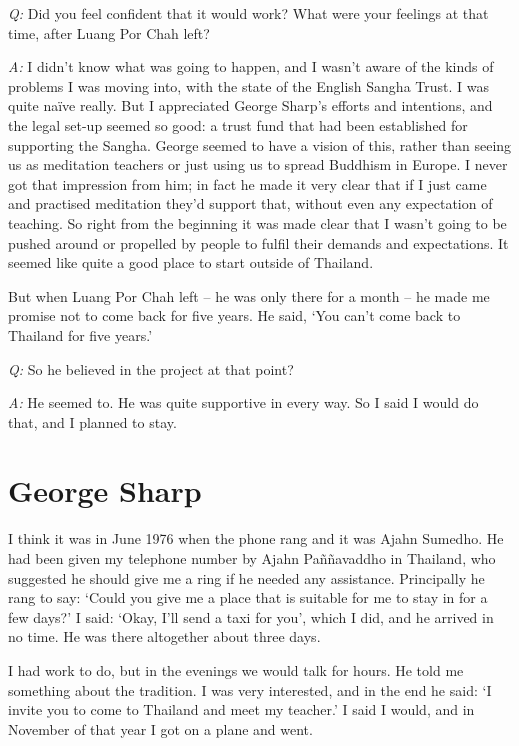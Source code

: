 \emph{Q:} Did you feel confident that it would work? What were your
feelings at that time, after Luang Por Chah left? 

\emph{A:} I didn't know what was going to happen, and I wasn't aware of the
kinds of problems I was moving into, with the state of the English
Sangha Trust. I was quite naïve really. But I appreciated George Sharp's
efforts and intentions, and the legal set-up seemed so good: a trust
fund that had been established for supporting the Sangha. George seemed
to have a vision of this, rather than seeing us as meditation teachers
or just using us to spread Buddhism in Europe. I never got that
impression from him; in fact he made it very clear that if I just came
and practised meditation they'd support that, without even any
expectation of teaching. So right from the beginning it was made clear
that I wasn't going to be pushed around or propelled by people to fulfil
their demands and expectations. It seemed like quite a good place to
start outside of Thailand.

But when Luang Por Chah left -- he was only there for a month -- he made
me promise not to come back for five years. He said, `You can't come
back to Thailand for five years.'

\emph{Q:} So he believed in the project at that point?

\emph{A:} He seemed to. He was quite supportive in every way. So I said
I would do that, and I planned to stay.

\section{George Sharp}

I think it was in June 1976 when the phone rang and it was Ajahn
Sumedho. He had been given my telephone number by Ajahn Paññavaddho in
Thailand, who suggested he should give me a ring if he needed any
assistance. Principally he rang to say: `Could you give me a place that
is suitable for me to stay in for a few days?' I said: `Okay, I'll send
a taxi for you', which I did, and he arrived in no time. He was there
altogether about three days.

I had work to do, but in the evenings we would talk for hours. He told
me something about the tradition. I was very interested, and in the end
he said: `I invite you to come to Thailand and meet my teacher.' I said
I would, and in November of that year I got on a plane and went. 

